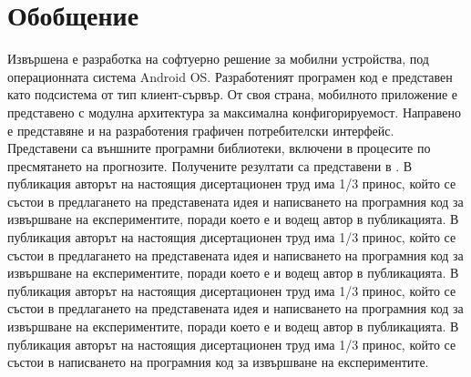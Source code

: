 \section{Обобщение}

Извършена е разработка на софтуерно решение за мобилни устройства, под операционната система Android OS. Разработеният програмен код е представен като подсистема от тип клиент-сървър. От своя страна, мобилното приложение е представено с модулна архитектура за максимална конфигорируемост. Направено е представяне и на разработения графичен потребителски интерфейс. Представени са външните програмни библиотеки, включени в процесите по пресмятането на прогнозите. Получените резултати са представени в \cite{Tomov-05, Tomov-06, Tomov-07, Zankinski-02}. В публикация \cite{Tomov-05} авторът на настоящия дисертационен труд има 1/3 принос, който се състои в предлагането на представената идея и написването на програмния код за извършване на експериментите, поради което е и водещ автор в публикацията. В публикация \cite{Tomov-06} авторът на настоящия дисертационен труд има 1/3 принос, който се състои в предлагането на представената идея и написването на програмния код за извършване на експериментите, поради което е и водещ автор в публикацията. В публикация \cite{Tomov-07} авторът на настоящия дисертационен труд има 1/3 принос, който се състои в предлагането на представената идея и написването на програмния код за извършване на експериментите, поради което е и водещ автор в публикацията. В публикация \cite{Zankinski-02} авторът на настоящия дисертационен труд има 1/3 принос, който се състои в написването на програмния код за извършване на експериментите.

